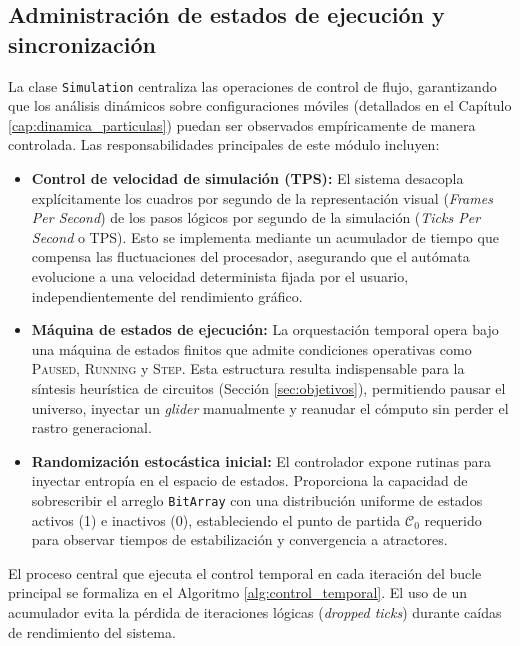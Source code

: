 \subsection{Administración de estados de ejecución y sincronización}

La clase \texttt{Simulation} centraliza las operaciones de control de flujo, garantizando que los análisis dinámicos sobre configuraciones móviles (detallados en el Capítulo \ref{cap:dinamica_particulas}) puedan ser observados empíricamente de manera controlada. Las responsabilidades principales de este módulo incluyen:

\begin{itemize}
    \item \textbf{Control de velocidad de simulación (TPS):} El sistema desacopla explícitamente los cuadros por segundo de la representación visual (\textit{Frames Per Second}) de los pasos lógicos por segundo de la simulación (\textit{Ticks Per Second} o TPS). Esto se implementa mediante un acumulador de tiempo que compensa las fluctuaciones del procesador, asegurando que el autómata evolucione a una velocidad determinista fijada por el usuario, independientemente del rendimiento gráfico.
    \item \textbf{Máquina de estados de ejecución:} La orquestación temporal opera bajo una máquina de estados finitos que admite condiciones operativas como \textsc{Paused}, \textsc{Running} y \textsc{Step}. Esta estructura resulta indispensable para la síntesis heurística de circuitos (Sección \ref{sec:objetivos}), permitiendo pausar el universo, inyectar un \textit{glider} manualmente y reanudar el cómputo sin perder el rastro generacional.
    \item \textbf{Randomización estocástica inicial:} El controlador expone rutinas para inyectar entropía en el espacio de estados. Proporciona la capacidad de sobrescribir el arreglo \texttt{BitArray} con una distribución uniforme de estados activos (1) e inactivos (0), estableciendo el punto de partida $\mathcal{C}_0$ requerido para observar tiempos de estabilización y convergencia a atractores.
\end{itemize}

El proceso central que ejecuta el control temporal en cada iteración del bucle principal se formaliza en el Algoritmo \ref{alg:control_temporal}. El uso de un acumulador evita la pérdida de iteraciones lógicas (\textit{dropped ticks}) durante caídas de rendimiento del sistema.

